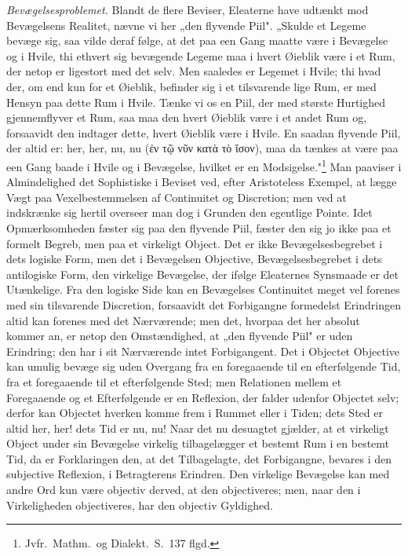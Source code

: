 \documentclass[12pt]{book}
\newcommand{\opage}[1]{\marginnote{\footnotesize\textit{[#1]}}}
\begin{document}
\emph{Bevægelsesproblemet.} Blandt de flere Beviser, Eleaterne have udtænkt mod Bevægelsens
Realitet, nævne vi her „den flyvende Piil". „Skulde et Legeme bevæge sig, saa vilde deraf følge,
at det paa een Gang maatte være i Bevægelse og i Hvile, thi ethvert sig bevægende Legeme maa i
hvert Øieblik være i et Rum, der netop er ligestort med det selv. Men saaledes er Legemet i
Hvile; thi hvad der, om end kun for et Øieblik, befinder sig i et tilsvarende lige Rum, er med
Hensyn paa dette Rum i Hvile. Tænke vi os en Piil, der med største Hurtighed gjennemflyver et
Rum, saa
\opage{173} maa den hvert Øieblik være i et andet Rum og, forsaavidt den indtager dette, hvert Øieblik være
i Hvile. En saadan flyvende Piil, der altid er: her, her, nu, nu (ἐν τῷ νῦν κατὰ τὸ ἴσον), maa da
tænkes at være paa een Gang baade i Hvile og i Bevægelse, hvilket er en
Modsigelse."\footnote{Jvfr.\ Mathm.\ og Dialekt.\ S.~137 flgd.} Man paaviser i Almindelighed det
Sophistiske i Beviset ved, efter Aristoteless Exempel, at lægge Vægt paa Vexelbestemmelsen af
Continuitet og Discretion; men ved at indskrænke sig hertil overseer man dog i Grunden den
egentlige Pointe. Idet Opmærksomheden fæster sig paa den flyvende Piil, fæster den sig jo ikke
paa et formelt Begreb, men paa et virkeligt Object. Det er ikke Bevægelsesbegrebet i dets
logiske Form, men det i Bevægelsen Objective, Bevægelsesbegrebet i dets antilogiske Form, den
virkelige Bevægelse, der ifølge Eleaternes Synsmaade er det Utænkelige. Fra den logiske Side kan
en Bevægelses Continuitet meget vel forenes med sin tilsvarende Discretion, forsaavidt det
Forbigangne formedelst Erindringen altid kan forenes med det Nærværende; men det, hvorpaa det
her absolut kommer an, er netop den Omstændighed, at „den flyvende Piil" er uden Erindring; den
har i sit Nærværende intet Forbigangent. Det i Objectet Objective kan umulig bevæge sig uden
Overgang fra en foregaaende til en efterfølgende Tid, fra et foregaaende til et efterfølgende
Sted; men Relationen mellem et Foregaaende og et Efterfølgende er en Reflexion, der falder
udenfor Objectet selv; derfor kan Objectet hverken komme frem i Rummet eller i Tiden; dets Sted
er altid her, her! dets Tid er nu, nu! Naar det nu desuagtet gjælder, at et virkeligt Object
under sin Bevægelse virkelig tilbagelægger et bestemt Rum i en bestemt Tid, da er Forklaringen
den, at det Tilbagelagte, det Forbigangne, bevares i den subjective Reflexion, i Betragterens
Erindren. Den virkelige Bevægelse kan med andre Ord
\opage{174} kun være objectiv derved, at den objectiveres; men, naar den i Virkeligheden objectiveres, har
den objectiv Gyldighed.
\end{document}
